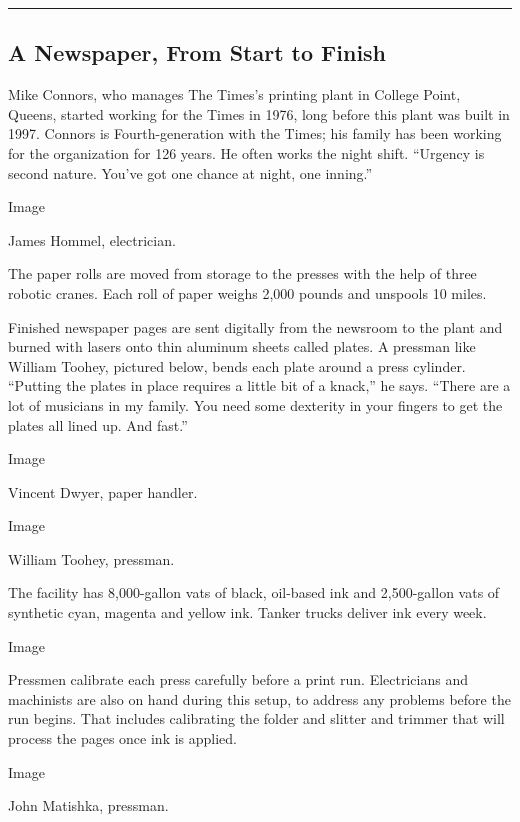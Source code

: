 \begin{center}\rule{0.5\linewidth}{\linethickness}\end{center}

\hypertarget{a-newspaper-from-start-to-finish}{%
\subsection{A Newspaper, From Start to
Finish}\label{a-newspaper-from-start-to-finish}}

Mike Connors, who manages The Times's printing plant in College Point,
Queens, started working for the Times in 1976, long before this plant
was built in 1997. Connors is Fourth-generation with the Times; his
family has been working for the organization for 126 years. He often
works the night shift. ``Urgency is second nature. You've got one chance
at night, one inning.''

Image

James Hommel, electrician.

The paper rolls are moved from storage to the presses with the help of
three robotic cranes. Each roll of paper weighs 2,000 pounds and
unspools 10 miles.

Finished newspaper pages are sent digitally from the newsroom to the
plant and burned with lasers onto thin aluminum sheets called plates. A
pressman like William Toohey, pictured below, bends each plate around a
press cylinder. ``Putting the plates in place requires a little bit of a
knack,'' he says. ``There are a lot of musicians in my family. You need
some dexterity in your fingers to get the plates all lined up. And
fast.''

Image

Vincent Dwyer, paper handler.

Image

William Toohey, pressman.

The facility has 8,000-gallon vats of black, oil-based ink and
2,500-gallon vats of synthetic cyan, magenta and yellow ink. Tanker
trucks deliver ink every week.

Image

Pressmen calibrate each press carefully before a print run. Electricians
and machinists are also on hand during this setup, to address any
problems before the run begins. That includes calibrating the folder and
slitter and trimmer that will process the pages once ink is applied.

Image

John Matishka, pressman.

